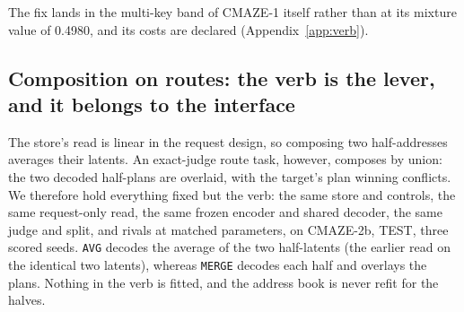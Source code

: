 \documentclass{article} %
\begin{document}
The fix lands in the multi-key band of CMAZE-1 itself rather than at its mixture value of 0.4980, and %
its costs are declared (Appendix~\ref{app:verb}).

\subsection{Composition on routes: the verb is the lever, and it belongs to the interface}
\label{sec:verb}

The store's read is linear in the request design, so composing two half-addresses averages
their latents. An exact-judge route task, however, composes by union: the two decoded half-plans
are overlaid, with the target's plan winning conflicts. We therefore hold everything fixed but
the verb: the same store and controls, the same request-only read, the same frozen encoder and
shared decoder, the same judge and split, and rivals at matched parameters, on CMAZE-2b, TEST,
three scored seeds. \texttt{AVG} decodes the average of the two half-latents (the earlier read
on the identical two latents), whereas \texttt{MERGE} decodes each half and overlays the plans.
Nothing in the verb is fitted, and the address book is never refit for the halves. %
\end{document}
